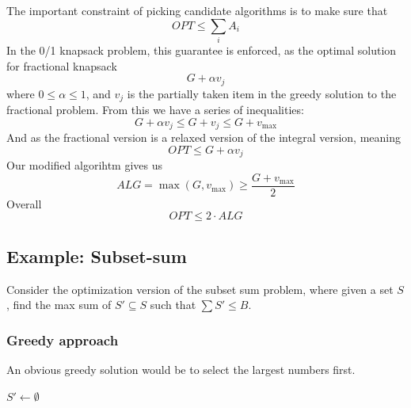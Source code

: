 \documentclass[10pt]{article}
\theoremstyle{definition}
\begin{document}
The important constraint of picking candidate algorithms is to make sure that 
\[OPT \leq \sum_i A_i\]
In the 0/1 knapsack problem, this guarantee is enforced, as the optimal solution for fractional knapsack
\[G + \alpha v_j\]
where $0 \leq \alpha \leq 1$, and $v_j$ is the partially taken item in the greedy solution to the fractional problem. From this we have a series of inequalities:
\[G + \alpha v_j \leq G + v_j \leq G + v_{\max}\]
And as the fractional version is a relaxed version of the integral version, meaning 
\[OPT \leq G + \alpha v_j\]
Our modified algorihtm gives us 
\[ALG = \max(G, v_{\max}) \geq \frac{G + v_{\max}}{2}\]
Overall 
\[OPT \leq 2 \cdot ALG\]

\subsection{Example: Subset-sum}
Consider the optimization version of the subset sum problem, where given a set $S$, find the max sum of $S' \subseteq S$ such that $\sum S' \leq B$. 

\subsubsection*{Greedy approach}
An obvious greedy solution would be to select the largest numbers first. 

\begin{algorithm}[H]

  $S' \gets \emptyset$\;
  \;
\end{algorithm}
\end{document}
